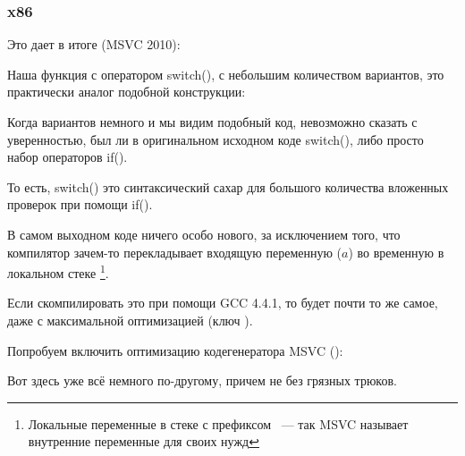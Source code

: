 \subsubsection{x86}


Это дает в итоге (MSVC 2010):



Наша функция с оператором switch(), с небольшим количеством вариантов, 
это практически аналог подобной конструкции:



Когда вариантов немного и мы видим подобный код, невозможно сказать с уверенностью, был ли
в оригинальном исходном коде switch(), либо просто набор операторов if().

\myindex{\SyntacticSugar}
То есть, switch() это синтаксический сахар для большого количества вложенных проверок 
при помощи if().

В самом выходном коде ничего особо нового, 
за исключением того, что компилятор зачем-то 
перекладывает входящую переменную ($a$) во временную в локальном стеке \footnote{Локальные переменные в стеке с префиксом ~--- 
так MSVC называет внутренние переменные для своих нужд}.

Если скомпилировать это при помощи GCC 4.4.1, то будет почти то же самое, даже с максимальной оптимизацией (ключ \Othree).



Попробуем включить оптимизацию кодегенератора MSVC (\Ox): 

\label{JMP_instead_of_RET}


Вот здесь уже всё немного по-другому, причем не без грязных трюков.

